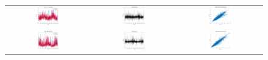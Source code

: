 \label{results hybrid different refit}

\begin{figure}[ht!]
  \centering
  \begin{tabular}{ccc}
    \includegraphics[width=0.32\textwidth]{graphs/hybrid/6 hours/mean_fr/actual vs forecast.jpg} &
    \includegraphics[width=0.32\textwidth]{graphs/hybrid/6 hours/mean_fr/residuals.jpg} &
    \includegraphics[width=0.32\textwidth]{graphs/hybrid/6 hours/mean_fr/scatter plot.jpg} \\
    \includegraphics[width=0.32\textwidth]{graphs/hybrid/6 hours/s_wht/actual vs forecast.jpg} &
    \includegraphics[width=0.32\textwidth]{graphs/hybrid/6 hours/s_wht/residuals.jpg} &
    \includegraphics[width=0.32\textwidth]{graphs/hybrid/6 hours/s_wht/scatter plot.jpg} \\

\end{tabular}
\end{figure}
